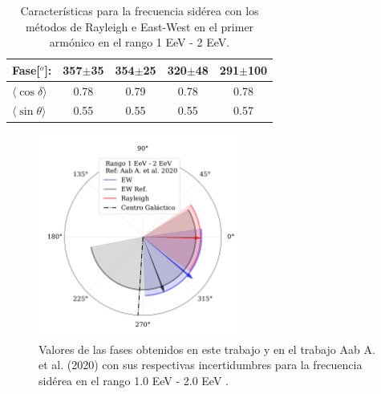 \begin{table}[H]
\begin{small}
\begin{center}
\begin{tabular}[c]{l|c|c|c||c|}
\multicolumn{1}{|l|}{Fase[$^o$]:             }  & 357$\pm$35             & 354$\pm$25                   & 320$\pm$48                 & 291$\pm$100      \\\hline
\multicolumn{1}{|l|}{$\langle\cos\delta\rangle$}&{0.78}& 0.79 &{0.78}                        & 0.78       \\        
\multicolumn{1}{|l|}{$\langle\sin\theta\rangle$}&{0.55}& 0.55 &{0.55}                        & 0.57       \\ \hline       
\end{tabular}
            \end{center}
        \end{small}
        \caption{Características para la frecuencia sidérea con los métodos de Rayleigh  e East-West en el primer armónico en el rango 1 EeV - 2 EeV.}
        \label{tab:siderea_3}
    \end{table}

    \begin{figure}[H]
        \begin{small}
            \begin{center}
                \vspace*{-0.2 cm}
                \includegraphics[width=0.6\textwidth]{phase_tercer_bin_v3.pdf}
                \vspace*{-1 cm}
            \end{center}
        \caption{Valores de las fases obtenidos en este trabajo y en el trabajo Aab A. et al. (2020) \cite{Aab_2020} con sus respectivas incertidumbres para la frecuencia sidérea en el  rango 1.0 EeV - 2.0 EeV .}
        \label{fig:tercer}
        \end{small}
    \end{figure}



